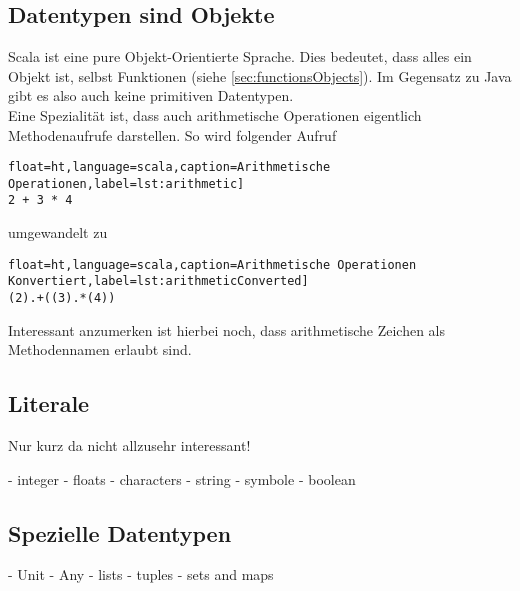\subsection{Datentypen sind Objekte}

Scala ist eine pure Objekt-Orientierte Sprache. Dies bedeutet, dass alles
ein Objekt ist, selbst Funktionen (siehe \ref{sec:functionsObjects}). Im
Gegensatz zu Java gibt es also auch keine primitiven Datentypen.\\

Eine Spezialität ist, dass auch arithmetische Operationen eigentlich
Methodenaufrufe darstellen. So wird folgender Aufruf

\begin{lstlisting}float=ht,language=scala,caption=Arithmetische Operationen,label=lst:arithmetic]
2 + 3 * 4
\end{lstlisting}

umgewandelt zu
\begin{lstlisting}float=ht,language=scala,caption=Arithmetische Operationen Konvertiert,label=lst:arithmeticConverted]
(2).+((3).*(4))
\end{lstlisting}

Interessant anzumerken ist hierbei noch, dass arithmetische Zeichen
als Methodennamen erlaubt sind.

\subsection{Literale}
Nur kurz da nicht allzusehr interessant!

- integer
- floats
- characters
- string
- symbole
- boolean


\subsection{Spezielle Datentypen}

- Unit
- Any
- lists
- tuples
- sets and maps
